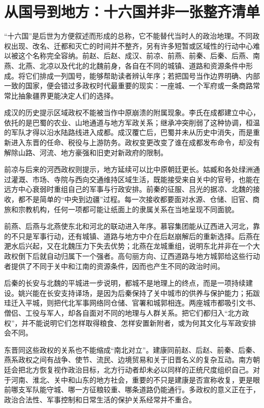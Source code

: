\section{从国号到地方：十六国并非一张整齐清单}
\label{sec:eastern-jin-depth-polity-reading}

“十六国”是后世为方便叙述而形成的总称，它不能替代当时人的政治地理。不同政权出现、改名、迁都和灭亡的时间并不整齐，另有许多短暂或区域性的行动中心难以被这个名称完全容纳。前赵、后赵、成汉、前凉、前燕、前秦、后秦、后燕、南燕、北燕、北凉以及代北的北魏前身，各自在不同的城镇、道路和资源条件中形成。将它们排成一列国号，能够帮助读者辨认年序；若把国号当作边界明确、内部一致的国家，便会错过多政权时代最重要的现实：一座城、一个军府或一条商路常常比抽象疆界更能决定人们的选择。

成汉的历史提示区域政权不能被当作中原崩溃的附属现象。李氏在成都建立中心，依托的是巴蜀的农业、山地通道与地方军政关系；继承冲突削弱了这种协调，桓温的军队才得以沿水陆路线进入成都。成汉覆亡后，巴蜀并未从历史中消失，而是重新进入东晋的任命、税役与上游防务。政权变更改变了谁在成都发布命令，却没有解除山路、河流、地方豪强和旧吏对新政府的限制。

前凉与后来的河西政权则提示，地方延续可以比中原朝廷更长。姑臧和各处绿洲通过灌溉、市场、寺院与西向交通维持区域生活，既能接受来自关中的官号，也能在远方中心衰弱时重组自己的军事与行政安排。前秦的征服、吕光的据凉、北魏的接收，都不是简单的“中央到边疆”过程。每一次接收都要面对水源、仓储、旧官、商旅和宗教机构，任何一项都可能让纸面上的隶属关系在当地呈现不同面貌。

前燕、后燕与北燕使东北和河北的联动进入年序。慕容集团能从辽西进入河北，靠的不只是军事行动，还有城镇、道路与地方中介在后赵崩解后的重新选择。后燕在淝水后兴起，又在北魏压力下失去优势；北燕在龙城重组，说明东北并非在一个大政权倒下后就自动归属下一个强者。高句丽方向、辽西道路与地方城郭给这些行动者提供了不同于关中和江南的资源条件，因而也产生不同的政治时间。

后秦的长安与北魏的平城进一步说明，都城不是地理上的终点，而是一项持续建设。姚兴能在长安支持译场，是因为后秦保持了关中城市的供养与保护能力；拓跋珪迁入平城，则把代北军事网络同仓储、官署和城郭相连。两座城市都吸引文书、僧侣、工役与军人，却各自面对不同的地理与人群关系。把它们都归入“北方政权”，并不能说明它们怎样取得粮食、怎样安置新附者，或为何其文化与军政安排会不同。

东晋同这些政权的关系也不能缩成“南北对立”。建康同前赵、后赵、前秦、后秦、燕系政权之间有战争、使节、流民、边境贸易和关于旧晋名义的复杂互动。南方朝廷会把北方恢复视作政治目标，北方行动者却未必以同样的正统尺度组织自己。对于河南、淮北、关中和山东的地方社会，重要的不只是建康是否宣称收复，更是眼前哪支军队能守城、哪一方征粮较重、哪条道路仍能通行。多政权的意义正在于，政治合法性、军事控制和日常生活的保护关系经常并不重合。

